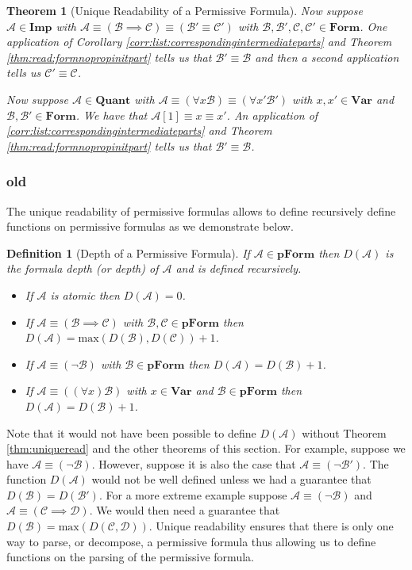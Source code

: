 \documentclass[12pt]{article}
\theoremstyle{break}
\newtheorem{definition}{Definition}[section]
\theoremstyle{break}
\newtheorem{theorem}{Theorem}[section]
\theoremstyle{break}
\theoremstyle{break}
\theoremstyle{break}
\newtheorem{informal definition}[definition]{Informal Definition}
\newcommand{\mc}[1]{\mathcal{#1}}
\begin{document}
\begin{theorem}[Unique Readability of a Permissive Formula]
Now suppose $\mc{A}\in\textbf{Imp}$ with $\mc{A}\equiv (\mc{B}\implies \mc{C})\equiv (\mc{B}'\equiv \mc{C}')$ with $\mc{B}, \mc{B}', \mc{C}, \mc{C}' \in \textbf{Form}$.
One application of Corollary \ref{corr:list:correspondingintermediateparts} and Theorem \ref{thm:read:formnopropinitpart} tells us that $\mc{B}'\equiv \mc{B}$ and then a second application tells us $\mc{C}'\equiv \mc{C}$.

Now suppose $\mc{A}\in\textbf{Quant}$ with $\mc{A}\equiv (\forall x \mc{B}) \equiv (\forall x'\mc{B}')$ with $x, x' \in \textbf{Var}$ and $\mc{B}, \mc{B}'\in\textbf{Form}$.
We have that $\mc{A}[1] \equiv x \equiv x'$.
An application of \ref{corr:list:correspondingintermediateparts} and Theorem \ref{thm:read:formnopropinitpart} tells us that $\mc{B}'\equiv \mc{B}$.
\end{theorem}




\subsubsection{old}
The unique readability of permissive formulas allows to define recursively define functions on permissive formulas as we demonstrate below.

\begin{definition}[Depth of a Permissive Formula]
If $\mc{A}\in\textbf{pForm}$ then $D(\mc{A})$ is the formula depth (or depth) of $\mc{A}$ and is defined recursively.
\begin{itemize}
\item{If $\mc{A}$ is atomic then $D(\mc{A}) = 0$.}
\item{If $\mc{A} \equiv (\mc{B} \implies \mc{C})$ with $\mc{B}, \mc{C} \in \textbf{pForm}$ then $D(\mc{A}) = \text{max}(D(\mc{B}), D(\mc{C})) + 1$.}
\item{If $\mc{A} \equiv (\lnot \mc{B})$ with $\mc{B}\in\textbf{pForm}$ then $D(\mc{A}) = D(\mc{B}) + 1$.}
\item{If $\mc{A} \equiv ((\forall x) \mc{B})$ with $x\in\textbf{Var}$ and $\mc{B} \in \textbf{pForm}$ then $D(\mc{A}) = D(\mc{B}) + 1$.}
\end{itemize}
\end{definition}

Note that it would not have been possible to define $D(\mc{A})$ without Theorem \ref{thm:uniqueread} and the other theorems of this section.
For example, suppose we have $\mc{A} \equiv (\lnot \mc{B})$.
However, suppose it is also the case that $\mc{A} \equiv (\lnot \mc{B}')$.
The function $D(\mc{A})$ would not be well defined unless we had a guarantee that $D(\mc{B}) = D(\mc{B}')$.
For a more extreme example suppose $\mc{A} \equiv (\lnot \mc{B})$ and $\mc{A} \equiv (\mc{C} \implies \mc{D})$.
We would then need a guarantee that $D(\mc{B}) = \text{max}(D(\mc{C}, \mc{D}))$.
Unique readability ensures that there is only one way to parse, or decompose, a permissive formula thus allowing us to define functions on the parsing of the permissive formula.
\end{document}
